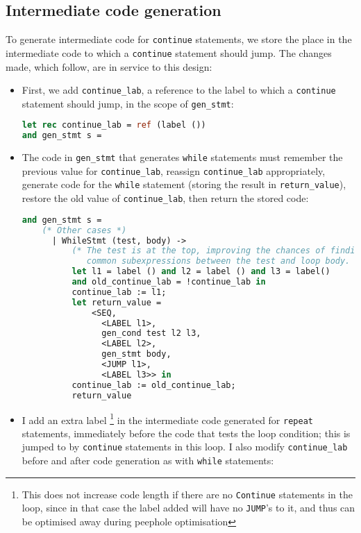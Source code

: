 \documentclass[a4paper,10pt]{article}
\begin{document}
\subsection{Intermediate code generation}
To generate intermediate code for  \texttt{continue} statements, we store the place in the intermediate code to which a \texttt{continue} statement should jump. The changes made, which follow, are in service to this design:
\begin{itemize}
    \item First, we add \texttt{continue\_lab}, a reference to the label to which a \texttt{continue} statement should jump, in the scope of \texttt{gen\_stmt}:
\begin{lstlisting}[language=ml]
let rec continue_lab = ref (label ())
and gen_stmt s = 
\end{lstlisting}
    \item The code in \texttt{gen\_stmt} that generates \texttt{while} statements must remember the previous value for \texttt{continue\_lab}, reassign \texttt{continue\_lab} appropriately, generate code for the \texttt{while} statement (storing the result in \texttt{return\_value}), restore the old value of \texttt{continue\_lab}, then return the stored code:
\begin{lstlisting}[language=ml]
and gen_stmt s = 
    (* Other cases *)
      | WhileStmt (test, body) ->
          (* The test is at the top, improving the chances of finding
             common subexpressions between the test and loop body. *)
          let l1 = label () and l2 = label () and l3 = label()
          and old_continue_lab = !continue_lab in
          continue_lab := l1;
          let return_value = 
              <SEQ,
                <LABEL l1>,
                gen_cond test l2 l3,
                <LABEL l2>,
                gen_stmt body,
                <JUMP l1>,
                <LABEL l3>> in
          continue_lab := old_continue_lab;
          return_value
\end{lstlisting}
    \item I add an extra label \footnote{This does not increase code length if there are no \texttt{Continue} statements in the loop, since in that case the label added will have no \texttt{JUMP}'s to it, and thus can be optimised away during peephole optimisation}  in the intermediate code generated for \texttt{repeat} statements, immediately before the code that tests the loop condition; this is jumped to by \texttt{continue} statements in this loop. I also modify \texttt{continue\_lab} before and after code generation as with \texttt{while} statements:

\end{itemize}
\end{document}
